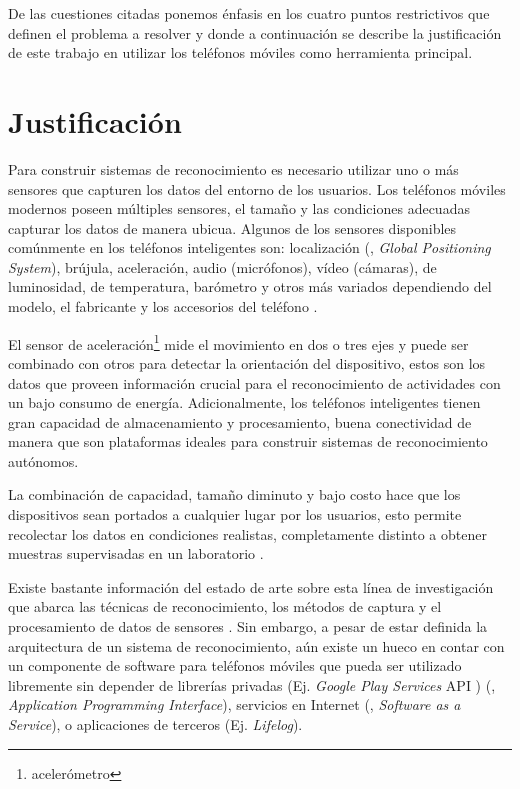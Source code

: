 De las cuestiones citadas ponemos énfasis en los cuatro puntos restrictivos
que definen el problema a resolver y donde a continuación se describe
la justificación de este trabajo en utilizar los teléfonos móviles
como herramienta principal.

\section{Justificación}

\label{sec12:justificaciuxf3n}

Para construir sistemas de reconocimiento es necesario utilizar uno
o más sensores que capturen los datos del entorno de los usuarios.
Los teléfonos móviles modernos poseen múltiples sensores, el tamaño
y las condiciones adecuadas capturar los datos de manera ubicua. Algunos
de los sensores disponibles comúnmente en los teléfonos inteligentes
son: localización (, \emph{Global Positioning System}),
brújula, aceleración, audio (micrófonos), vídeo (cámaras), de luminosidad,
de temperatura, barómetro y otros más variados dependiendo del modelo,
el fabricante y los accesorios del teléfono \cite{Kwapisz2011}.

El sensor de aceleración\footnote{acelerómetro} mide el movimiento
en dos o tres ejes y puede ser combinado con otros para detectar la
orientación del dispositivo, estos son los datos que proveen información
crucial para el reconocimiento de actividades con un bajo consumo
de energía. Adicionalmente, los teléfonos inteligentes tienen gran
capacidad de almacenamiento y procesamiento, buena conectividad de
manera que son plataformas ideales para construir sistemas de reconocimiento
autónomos.

La combinación de capacidad, tamaño diminuto y bajo costo hace que
los dispositivos sean portados a cualquier lugar por los usuarios,
esto permite recolectar los datos en condiciones realistas, completamente
distinto a obtener muestras supervisadas en un laboratorio \cite{Bao2004}. 

Existe bastante información del estado de arte sobre esta línea de
investigación que abarca las técnicas de reconocimiento, los métodos
de captura y el procesamiento de datos de sensores \cite{LaraLabrador2012,Kwapisz2011}.
Sin embargo, a pesar de estar definida la arquitectura de un sistema
de reconocimiento, aún existe un hueco en contar con un componente
de software para teléfonos móviles que pueda ser utilizado libremente
sin depender de librerías privadas (Ej. \emph{Google Play Services}
API \cite{Google2016l}) (, \emph{Application Programming
Interface}), servicios en Internet (, \emph{Software as
a Service}), o aplicaciones de terceros (Ej. \emph{Lifelog}).

